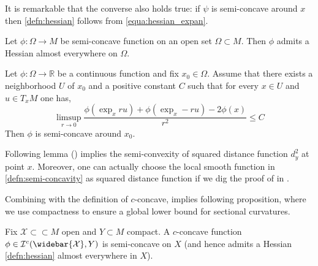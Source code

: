 It is remarkable that the converse also holds true: if \( \psi \) is semi-concave around \( x \) then \cref{defn:hessian} follows from \cref{equa:hessian_expan}.


\begin{thm}
	Let \( \phi : \Omega \rightarrow M \) be semi-concave function on an open set \( \Omega \subset M . \) Then \( \phi \) admits a Hessian almost everywhere on \( \Omega \).
\end{thm}

\begin{lem}
	\label{lem:sufficient_condition_semi-concavity}
	Let \( \phi : \Omega \rightarrow \mathbb { R } \) be a continuous function and fix \( x _ { 0 } \in \Omega \).
	Assume that there exists a neighborhood \( U \) of \( x _ { 0 } \) and a positive constant \( C \) such that for every \( x \in U \) and
	\( u \in T _ { x } M \) one has,
	\[ \limsup _ { r \rightarrow 0 } \frac { \phi \left( \exp _ { x } r u \right) + \phi \left( \exp _ { x } - r u \right) - 2 \phi ( x ) } { r ^ { 2 } } \leq C \]
	Then \( \phi \) is semi-concave around \( x _ { 0 } \).
\end{lem}
Following lemma (\cite[Lemma 3.12]{cordero2001riemannian}) implies
the semi-convexity of squared distance function $d_y^2$ at point $x$.
Moreover, one can actually choose the local smooth function in \cref{defn:semi-concavity} as squared distance function
if we dig the proof of  in \cite[Lemma 3.11]{cordero2001riemannian}.


Combining with the definition of $c$-concave,
 implies following proposition,
where we use compactness to ensure a global lower bound for sectional curvatures.

\begin{prop}
	Fix \(\mathcal{X} \subset \subset M \) open and \( Y \subset M \) compact.
	A \( c \)-concave function \( \phi \in \mathcal{I} ^ { c } ( \widebar { \mathcal{X} } , Y ) \) is semi-concave on \( X \) (and hence admits a Hessian \cref{defn:hessian} almost everywhere in \( X \)).
\end{prop}

